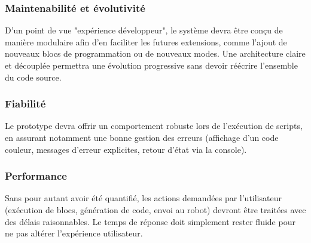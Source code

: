 \subsubsection{Maintenabilité et évolutivité}
D'un point de vue "expérience développeur", le système devra être conçu de manière modulaire afin d'en faciliter les futures extensions, comme l’ajout de nouveaux blocs de programmation ou de nouveaux modes.
Une architecture claire et découplée permettra une évolution progressive sans devoir réécrire l’ensemble du code source.

\subsubsection{Fiabilité}
Le prototype devra offrir un comportement robuste lors de l’exécution de scripts, en assurant notamment une bonne gestion des erreurs (affichage d’un code couleur, messages d’erreur explicites, retour d’état via la console).

\subsubsection{Performance}
Sans pour autant avoir été quantifié, les actions demandées par l’utilisateur (exécution de blocs, génération de code, envoi au robot) devront être traitées avec des délais raisonnables. 
Le temps de réponse doit simplement rester fluide pour ne pas altérer l’expérience utilisateur.
